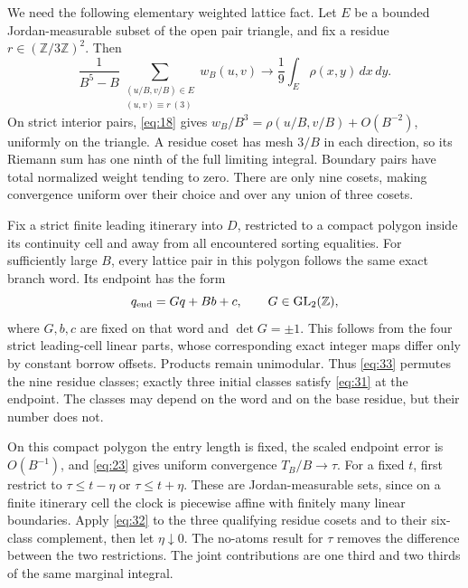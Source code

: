 \documentclass[11pt]{amsart}
\begin{document}
We need the following elementary weighted lattice fact. Let \(E\) be a bounded Jordan-measurable subset of the open pair triangle, and fix a residue \(r\in(\mathbb Z/3\mathbb Z)^2\). Then \begin{equation}\label{eq:32}
\frac1{B^5-B}\sum_{\substack{(u/B,v/B)\in E\\(u,v)\equiv r\ (3)}}
 w_B(u,v)\longrightarrow\frac19\int_E\rho(x,y)\,dx\,dy.
\end{equation} On strict interior pairs, \eqref{eq:18} gives \(w_B/B^3=\rho(u/B,v/B)+O(B^{-2})\), uniformly on the triangle. A residue coset has mesh \(3/B\) in each direction, so its Riemann sum has one ninth of the full limiting integral. Boundary pairs have total normalized weight tending to zero. There are only nine cosets, making convergence uniform over their choice and over any union of three cosets.

Fix a strict finite leading itinerary into \(D\), restricted to a compact polygon inside its continuity cell and away from all encountered sorting equalities. For sufficiently large \(B\), every lattice pair in this polygon follows the same exact branch word. Its endpoint has the form \begin{equation}\label{eq:33}
q_{\rm end}=Gq+B b+c,\qquad G\in\operatorname{GL}_2(\mathbb Z),
\end{equation} where \(G,b,c\) are fixed on that word and \(\det G=\pm1\). This follows from the four strict leading-cell linear parts, whose corresponding exact integer maps differ only by constant borrow offsets. Products remain unimodular. Thus \eqref{eq:33} permutes the nine residue classes; exactly three initial classes satisfy \eqref{eq:31} at the endpoint. The classes may depend on the word and on the base residue, but their number does not.

On this compact polygon the entry length is fixed, the scaled endpoint error is \(O(B^{-1})\), and \eqref{eq:23} gives uniform convergence \(T_B/B\to\tau\). For a fixed \(t\), first restrict to \(\tau\le t-\eta\) or \(\tau\le t+\eta\). These are Jordan-measurable sets, since on a finite itinerary cell the clock is piecewise affine with finitely many linear boundaries. Apply \eqref{eq:32} to the three qualifying residue cosets and to their six-class complement, then let \(\eta\downarrow0\). The no-atoms result for \(\tau\) removes the difference between the two restrictions. The joint contributions are one third and two thirds of the same marginal integral.
\end{document}
